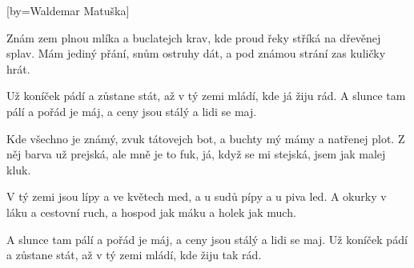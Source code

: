 [by={Waldemar Matuška}]

\beginverse{}
Znám zem plnou mlíka a buclatejch krav,
kde proud řeky stříká na dřevěnej splav.
Mám jediný přání, snům ostruhy dát,
a pod známou strání zas kuličky hrát.
\endverse{}

\beginchorus{}
Už koníček pádí a zůstane stát,
až v tý zemi mládí, kde já žiju rád.
A slunce tam pálí a pořád je máj,
a ceny jsou stálý a lidi se maj.
\endchorus{}

\beginverse{}
Kde všechno je známý, zvuk tátovejch bot,
a buchty mý mámy a natřenej plot.
Z něj barva už prejská, ale mně je to fuk,
já, když se mi stejská, jsem jak malej kluk.
\endverse{}

\beginchorus{}
\phantom{}
\endchorus{}

\beginverse{}
V tý zemi jsou lípy a ve květech med,
a u sudů pípy a u piva led.
A okurky v láku a cestovní ruch,
a hospod jak máku a holek jak much.
\endverse{}

\beginchorus{}
A slunce tam pálí a pořád je máj,
a ceny jsou stálý a lidi se maj.
Už koníček pádí a zůstane stát,
až v tý zemi mládí, kde žiju tak rád.
\endchorus{}

\endsong{}
